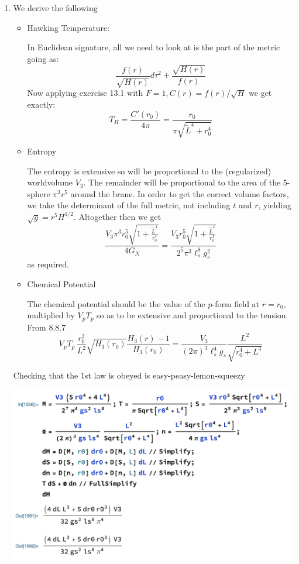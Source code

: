 \documentclass[11pt, class=article, crop=false]{standalone}
\begin{document}
\begin{enumerate}
	\item We derive the following
	\begin{itemize}
		\item Hawking Temperature:
		
		In Euclidean signature, all we need to look at is the part of the metric going as:
		\[
			\frac{f(r)}{\sqrt{H(r)}} d\tau^2 + \frac{\sqrt{H(r)}}{f(r)}
		\]
		Now applying exercise 13.1 with $F = 1, C(r) = f(r) / \sqrt{H}$ we get exactly:
		\[
			T_H = \frac{C'(r_0)}{4\pi} = \frac{r_0}{\pi \sqrt{\tilde L^4 + r_0^4}}
		\]
		\item Entropy
		
		The entropy is extensive so will be proportional to the (regularized) worldvolume $V_3$. The remainder will be proportional to the area of the 5-sphere $\pi^3 r^5$ around the brane. In order to get the correct volume factors, we take the determinant of the full metric, not including $t$ and $r$, yielding $\sqrt g =  r^5 H^{1/2}$. Altogether then we get
		\[
			\frac{V_3 \pi^3 r_0^5 \sqrt{1 + \frac{\tilde L^4}{r_0^4}}}{4 G_N} = \frac{V_3 r_0^5 \sqrt{1 + \frac{\tilde L^4}{r_0^4}}}{2^5 \pi^3 \ell_s^8 g_s^2}
		\]
		as required.
		
		\item Chemical Potential 
		
		The chemical potential should be the value of the $p$-form field at $r=r_0$, multiplied by $V_p T_p$ so as to be extensive and proportional to the tension. From 8.8.7
		\[
			V_p T_p\, \frac{r_0^{2}}{L^{2}} \sqrt{H_3(r_0)} \frac{H_3(r)- 1}{H_3(r_0)} = \frac{V_3}{(2 \pi)^3 \ell_s^4 g_s} \frac{L^2}{\sqrt{r_0^4 + L^4}}
		\]
		
	\end{itemize}
	
	Checking that the 1st law is obeyed is easy-peasy-lemon-squeezy
	\begin{center}
		\includegraphics[scale=0.5]{"Figures/1st Law D3"}
	\end{center}
	

\end{enumerate}
\end{document}
